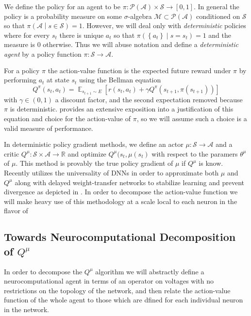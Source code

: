 \documentclass{article} %
\numberwithin{equation}{subsection}
\numberwithin{theorem}{subsection}
\def\expect{\mathop{{\mathbb{E}}}}
\newcommand{\set}[1]{ \left\{ #1 \right\} }
\def\suchthat{\mathrel{}\middle|\mathrel{}}
\def\scriptm{{\mathcal M}}
\def\scripta{{\mathcal A}}
\def\scriptp{{\mathcal P}}
\def\scripts{{\mathcal S}}
\begin{document}
We define the policy for an agent to be $\pi: \scriptp(\scripta) \times \scripts \to [0,1]$. In general the policy is a probability measure on some $\sigma$-algebra $\scriptm \subset \scriptp(\scripta)$ conditioned on $\scripts$ so that $\pi\left(\scripta \suchthat s \in \scripts\right) = 1$. However, we will deal only with \emph{deterministic} policies where for every $s_t$ there is unique $a_t$ so that $\pi\left(\set{a_t} \suchthat s = s_t\right) = 1$ and the measure is $0$ otherwise. Thus we will abuse notation and define a \emph{deterministic agent} by a policy function $\pi: \scripts \to \scripta$.	

For a policy $\pi$  the action-value function is the expected future reward under $\pi$ by performing $a_t$ at state $s_t$ using the Bellman equation
\begin{equation}
	Q^{\pi}(s_t, a_t) = \expect_{s_{t+1} \sim E}\left[r(s_{t}, a_t) + \gamma Q^{\pi}(s_{t+1}, \pi(s_{t+1}))\right]
\end{equation}
with $\gamma \in (0,1)$ a discount factor, and the second expectation removed because $\pi$ is deterministic.  provides an extensive exposition into a justification of this equation and choice for the action-value of $\pi$, so we will assume such a choice is a valid measure of performance.

In deterministic policy gradient methods, we define an actor $\mu: \scripts \to \scripta$ and a critic $Q^\mu: \scripts \times \scripta \to \mathbb{R}$ and optimize $Q^\mu(s_t, \mu(s_t)$ with respect to the paramers $\theta^\mu$ of $\mu.$ This method is provably the true policy gradient of $\mu$ if $Q^\mu$ is know. Recently  utilizes the universality of DNNs in order to approximate both $\mu$ and $Q^\mu$ along with delayed weight-transfer networks to stabilize learning and  prevent divergence as depicted in . In order to decompose the action-value function we will make heavy use of this methodology at a scale local to each neuron in the flavor of 

\subsection{Towards Neurocomputational Decomposition of $Q^\mu$}

In order to decompose the $Q^\mu$ algorithm we will abstractly define a neurocomputational agent in terms of an operator on voltages with no restrictions on the topology of the network, and then relate the action-value function of the whole agent to those which are dfined for each individual neuron in the network.
\end{document}
